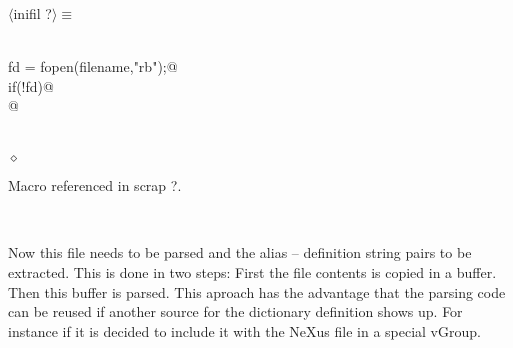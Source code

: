 \documentclass[12pt]{article}
\begin{document}
\begin{flushleft} \small
\begin{minipage}{\linewidth} \label{scrap8}
$\langle$inifil {\footnotesize ?}$\rangle\equiv$
\vspace{-1ex}
\begin{list}{}{} \item
\mbox{}\verb@@\\
\mbox{}\verb@      fd = fopen(filename,"rb");@\\
\mbox{}\verb@      if(!fd)@\\
\mbox{}@\\
\mbox{}\verb@@\\
\mbox{}\verb@@\\
\mbox{}\verb@@$\diamond$
\end{list}
\vspace{-1ex}
\footnotesize\addtolength{\baselineskip}{-1ex}
\begin{list}{}{\setlength{\itemsep}{-\parsep}\setlength{\itemindent}{-\leftmargin}}
\item Macro referenced in scrap ?.
\end{list}
\end{minipage}\\[4ex]
\end{flushleft}
Now this file needs to be parsed and the alias -- definition string pairs to
be extracted. This is done in two steps: First the file contents is copied
in a buffer. Then this buffer is parsed. This aproach has the advantage that
the parsing code can be reused if another source for the dictionary
definition shows up. For instance if it is decided to include it with the
NeXus file in a special vGroup. 
\end{document}
